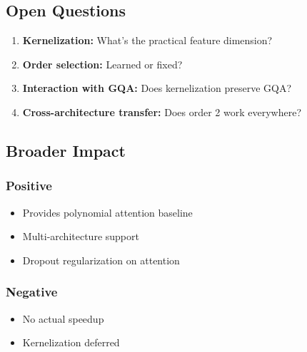 \subsection{Open Questions}

\begin{enumerate}
\item \textbf{Kernelization:} What's the practical feature dimension?
\item \textbf{Order selection:} Learned or fixed?
\item \textbf{Interaction with GQA:} Does kernelization preserve GQA?
\item \textbf{Cross-architecture transfer:} Does order 2 work everywhere?

\end{enumerate}
\subsection{Broader Impact}

\subsubsection{Positive}
\begin{itemize}
\item Provides polynomial attention baseline
\item Multi-architecture support
\item Dropout regularization on attention

\end{itemize}
\subsubsection{Negative}
\begin{itemize}
\item No actual speedup
\item Kernelization deferred

\end{itemize}
